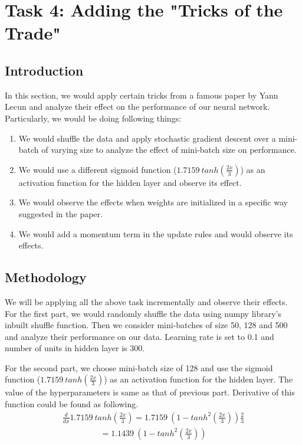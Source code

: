 \documentclass{article}
\begin{document}
\section{Task 4: Adding the "Tricks of the Trade"}

\subsection{Introduction}
In this section, we would apply certain tricks from a famous paper by Yann Lecun and analyze their effect on the performance of our neural network. Particularly, we would be doing following things:
\begin{enumerate}
  \item We would shuffle the data and apply stochastic gradient descent over a mini-batch of varying size to analyze the effect of mini-batch size on performance.
  \item We would use a different sigmoid function ($1.7159 \: tanh(\frac{2x}{3})$) as an activation function for the hidden layer and observe its effect.
  \item We would observe the effects when weights are initialized in a specific way suggested in the paper.
  \item We would add a momentum term in the update rules and would observe its effects.
\end{enumerate}

\subsection{Methodology}
We will be applying all the above task incrementally and observe their effects. For the first part, we would randomly shuffle the data using numpy library's inbuilt shuffle function. Then we consider mini-batches of size 50, 128 and 500 and analyze their performance on our data. Learning rate is set to 0.1 and number of units in hidden layer is 300.

For the second part, we choose mini-batch size of 128 and use the sigmoid function ($1.7159\:tanh(\frac{2x}{3})$) as an activation function for the hidden layer. The value of the hyperparameters is same as that of previous part. Derivative of this function could be found as following.
\begin{align*}
\frac{d}{dx} 1.7159 \: tanh(\frac{2x}{3}) = 1.7159 \: (1 - tanh^{2}\left(\frac{2x}{3}\right)) \frac{2}{3} 
\end{align*}
\begin{align*}
= 1.1439 \: (1 - tanh^{2}\left(\frac{2x}{3}\right))
\end{align*}
\end{document}
